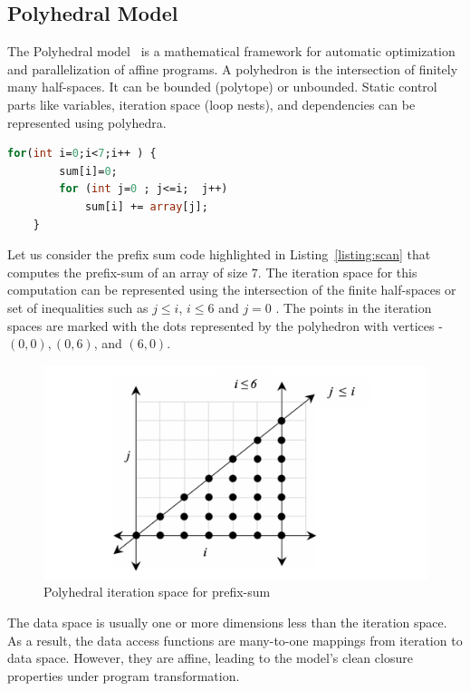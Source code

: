 \subsection{Polyhedral Model}
The Polyhedral model~\cite{sanjay-fst-tcs, quinton-jvsp89, feautrier91, feautrier92a, feautrier92b} is a mathematical framework for automatic optimization and parallelization of affine programs. A polyhedron is the intersection of finitely many half-spaces. It can be bounded (polytope) or unbounded. Static control parts like variables, iteration space (loop nests), and dependencies can be represented using polyhedra. 
\begin{lstlisting}[label={listing:scan}, language=Caml, caption={Prefix sum}]
    for(int i=0;i<7;i++ ) {
        sum[i]=0;
        for (int j=0 ; j<=i;  j++) 
            sum[i] += array[j]; 
    }
\end{lstlisting}
Let us consider the prefix sum code highlighted in Listing~\ref{listing:scan}   that computes the prefix-sum of an array of size $7$. The iteration space for this computation can be represented using the intersection of the finite half-spaces or set of inequalities such as $j \leq i$,  $i \leq 6$  and $j = 0$ .  The points in the iteration spaces are marked with the dots represented by the polyhedron with vertices - $(0, 0), (0, 6)$, and $(6, 0)$.
\begin{figure}[htbp]
\begin{adjustbox}{varwidth=\textwidth,margin=0 {\abovecaptionskip} 0 0, frame=0.00pt}
\centerline{\includegraphics[scale=.48]{iteration_space.png}}
\end{adjustbox}
\caption{Polyhedral iteration space for prefix-sum}
\label{fig}
\end{figure}
The data space is usually one or more dimensions less than the iteration space. As a result, the data access functions are many-to-one mappings from iteration to data space. However, they are affine, leading to the model's clean closure properties under program transformation.

